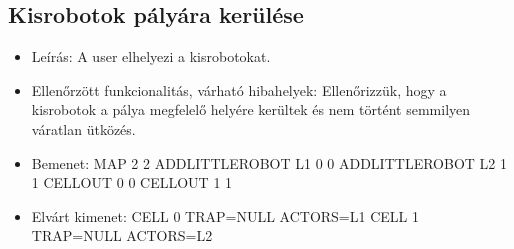 \subsection{Kisrobotok pályára kerülése}
\begin{itemize}
\item Leírás: \newline
A user elhelyezi a kisrobotokat.
\item Ellenőrzött funkcionalitás, várható hibahelyek: \newline
Ellenőrizzük, hogy a kisrobotok a pálya megfelelő helyére kerültek és nem történt semmilyen váratlan ütközés.
\item Bemenet: \newline
MAP 2 2
ADDLITTLEROBOT L1 0 0
ADDLITTLEROBOT L2 1 1
CELLOUT 0 0
CELLOUT 1 1
\item Elvárt kimenet: \newline
CELL 0 TRAP=NULL ACTORS=L1
CELL 1 TRAP=NULL ACTORS=L2
\end{itemize}

